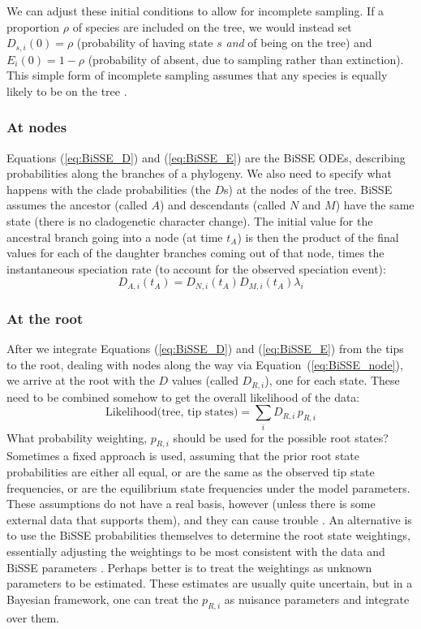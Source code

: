 We can adjust these initial conditions to allow for incomplete sampling.
If a proportion $\rho$ of species are included on the tree, we would instead set $D_{s,i}(0) = \rho$ (probability of having state $s$ \emph{and} of being on the tree) and $E_i(0) = 1-\rho$ (probability of absent, due to sampling rather than extinction).
This simple form of incomplete sampling assumes that any species is equally likely to be on the tree \citep{FitzJohn2009}.

\subsubsection{At nodes}

Equations (\ref{eq:BiSSE_D}) and (\ref{eq:BiSSE_E}) are the BiSSE ODEs, describing probabilities along the branches of a phylogeny.
We also need to specify what happens with the clade probabilities (the $D$s) at the nodes of the tree.
BiSSE assumes the ancestor (called $A$) and descendants (called $N$ and $M$) have the same state (\IE there is no cladogenetic character change).
The initial value for the ancestral branch going into a node (at time $t_A$) is then the product of the final values for each of the daughter branches coming out of that node, times the instantaneous speciation rate (to account for the observed speciation event):
\begin{equation}
    D_{A, i}(t_A) = D_{N, i}(t_A) D_{M, i}(t_A) \lambda_i
    \label{eq:BiSSE_node}
\end{equation}

\subsubsection{At the root}

After we integrate Equations (\ref{eq:BiSSE_D}) and (\ref{eq:BiSSE_E}) from the tips to the root, dealing with nodes along the way via Equation~(\ref{eq:BiSSE_node}), we arrive at the root with the $D$ values (called $D_{R, i}$), one for each state.
These need to be combined somehow to get the overall likelihood of the data:
\begin{equation*}
    \text{Likelihood(tree, tip states)} = \sum_i D_{R, i} \, p_{R, i}
\end{equation*}
What probability weighting, $p_{R, i}$ should be used for the possible root states?
Sometimes a fixed approach is used, assuming that the prior root state probabilities are either all equal, or are the same as the observed tip state frequencies, or are the equilibrium state frequencies under the model parameters.
These assumptions do not have a real basis, however (unless there is some external data that supports them), and they can cause trouble \citep{Goldberg2008}.
An alternative is to use the BiSSE probabilities themselves to determine the root state weightings, essentially adjusting the weightings to be most consistent with the data and BiSSE parameters \citep{FitzJohn2009}.
Perhaps better is to treat the weightings as unknown parameters to be estimated.
These estimates are usually quite uncertain, but in a Bayesian framework, one can treat the $p_{R, i}$ as nuisance parameters and integrate over them. 

